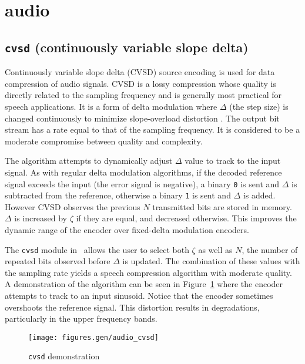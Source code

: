 % 
%
\section{audio}
\label{module:audio}

\subsection{{\tt cvsd} (continuously variable slope delta)}
\label{module:audio:cvsd}
Continuously variable slope delta (CVSD) source encoding is used for data
compression of audio signals.
CVSD is a lossy compression whose quality is directly related to the sampling
frequency and is generally most practical for speech applications.
It is a form of delta modulation where $\Delta$ (the step size) is changed
continuously to minimize slope-overload distortion \cite[p. 131]{Proakis:2001}.
The output bit stream has a rate equal to that of the sampling frequency.
It is considered to be a moderate compromise between quality and complexity.

The algorithm attempts to dynamically adjust $\Delta$ value to track
to the input signal.
As with regular delta modulation algorithms,
if the decoded reference signal exceeds the input (the error signal is
negative), a binary {\tt 0} is sent and $\Delta$ is subtracted from the
reference, otherwise a binary {\tt 1} is sent and $\Delta$ is added.
However CVSD observes the previous $N$ transmitted bits are stored in memory.
$\Delta$ is increased by $\zeta$ if they are equal, and decreased otherwise.
This improves the dynamic range of the encoder over fixed-delta modulation
encoders.

The {\tt cvsd} module in \liquid\ allows the user to select both $\zeta$
as well as $N$, the number of repeated bits observed before $\Delta$ is
updated.
The combination of these values with the sampling rate yields a speech
compression algorithm with moderate quality.
A demonstration of the algorithm can be seen in
Figure~\ref{fig:module:audio:cvsd} where the encoder attempts to track to an
input sinusoid.
Notice that the encoder sometimes overshoots the reference signal.
This distortion results in degradations, particularly in the upper frequency
bands.

\begin{figure}
\centering
  \texttt{[image: figures.gen/audio\_cvsd]}
\caption{{\tt cvsd} demonstration}
\label{fig:module:audio:cvsd}
\end{figure}

